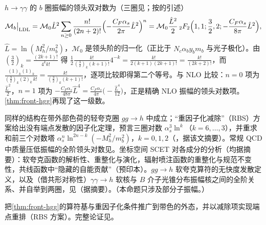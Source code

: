 \begin{example}[领头双对数与 ${}_2F_2$]\label{ex:front-hgg-ldl}
$h\to\gamma\gamma$ 的 $b$ 圈振幅的领头双对数为\cite{Kotsky:1997rq,Akhoury:2001mz}（三圈见\cite{Penin:2014msa,Liu:2017vkm,Liu:2018czl}；按\cite[式~(3)]{Liu:2019oav}的引述）
\begin{equation}\label{eq:front-ldl}
\mathcal M_b\big|_{\rm LDL}=\mathcal M_0\hat L^2\sum_{n\ge0}\frac{n!}{(2n+2)!}\Bigl(-\frac{C_F\alpha_s}{2\pi}\hat L^2\Bigr)^n
=\mathcal M_0\frac{\hat L^2}{2}\,{}_2F_2\Bigl(1,1;\frac32,2;-\frac{C_F\alpha_s}{8\pi}\hat L^2\Bigr),
\end{equation}
$\hat L=\ln(M_h^2/m_b^2)$，$\mathcal M_0$ 是领头阶的归一化（正比于 $N_c\alpha_by_bm_b$ 与光子极化）。由 $(\frac32)_k=\frac{(2k+1)!}{4^kk!}$ 得 $\frac12\frac{k!}{(\frac32)_k(k+1)!}4^{-k}=\frac{k!}{2(k+1)(2k+1)!}=\frac{k!}{(2k+2)!}$，而 $\frac{(1)_k(1)_k}{(\frac32)_k(2)_k\,k!}=\frac{k!}{(\frac32)_k(k+1)!}$，逐项比较即得第二个等号。与 NLO 比较：$n=0$ 项为 $\frac{\hat L^2}2$，$n=1$ 项为 $-\frac{C_F\alpha_s}{48\pi}\hat L^4=\frac{C_F\alpha_s}{4\pi}\bigl(-\frac{\hat L^4}{12}\bigr)$，正是精确 NLO 振幅\cite[式~(1)]{Liu:2019oav}的领头对数项。\cref{thm:front-hgg}再现了这一级数。
\end{example}

\begin{proposition}\label{prop:front-ggh}
同样的结构在带外部色荷的轻夸克圈 $gg\to h$ 中成立；“重因子化减除”（RBS）方案给出没有端点发散的因子化定理，预言三圈对数 $\alpha_s^3\ln^k$（$k=6,\dots,3$），并重求和前三个对数塔 $\alpha_s^n\ln^{2n-k}(-M_h^2/m_b^2)$，$k=0,1,2$（\cite{Liu:2022ajh}，据该文摘要）。常规 QCD 中质量压低振幅的全阶领头对数见\cite{Liu:2017vkm,Liu:2018czl}。坐标空间 SCET 对各成分的分析（均据摘要）：软夸克函数的解析性、重整化与演化\cite{Bodwin:2021cpx}，辐射喷注函数的重整化\cite{Bodwin:2021epw}与规范不变性\cite{Bodwin:2023asf}，共线函数中“隐藏的自能贡献”\cite{Bodwin:2025zzi}（预印本）。$gg\to h$ 软夸克算符的无快度发散定义，以及（借共形对称性）$\gamma\gamma\to h$ 软核与 $B$ 介子光锥分布振幅核之间的全阶关系、并自举到两圈，见\cite{Beneke:2024cpq}（据摘要）。（本命题只涉及部分子振幅。）
\end{proposition}

\begin{proofsketch}
把\cref{thm:front-hgg}的算符基与重因子化条件推广到带色的外态，并以减除项实现端点重排（RBS 方案）。完整论证见\cite{Liu:2022ajh}。
\end{proofsketch}

